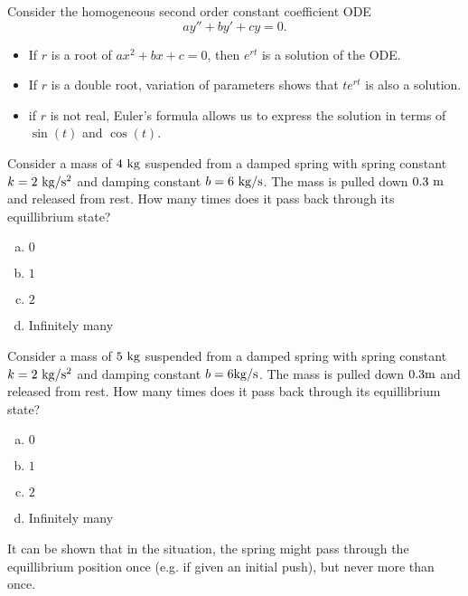 
\begin{applicationActivities}

\begin{observation}
Consider the homogeneous second order constant coefficient ODE \[ay''+by'+cy=0.\]
\vfill
\begin{itemize}
\item If \(r\) is a root of \(ax^2+bx+c=0\), then \(e^{rt}\) is a solution of the ODE.
\item If \(r\) is a double root, variation of parameters shows that \(te^{rt}\) is also a solution.
\item if \(r\) is not real, Euler's formula allows us to express the solution in terms of \(\sin(t)\) and \(\cos(t)\).
\end{itemize}
\end{observation}

\begin{activity}{15}
Consider a mass of \(4\ {\rm kg}\) suspended from a damped spring with spring constant \(k=2\ {\rm kg/s^2}\) and damping constant \(b= 6\ {\rm kg/s}\).  
\vfill
The mass is pulled down \(0.3\ {\rm m}\) and released from rest.  How many times does it pass back through its equillibrium state?
\vfill
\begin{enumerate}[(a)]
\item \(0\)
\item \(1\)
\item \(2\)
\item Infinitely many
\end{enumerate}
\end{activity}

\begin{activity}{15}
Consider a mass of \(5\ {\rm kg}\) suspended from a damped spring with spring constant \(k=2\ {\rm kg/s^2}\) and damping constant \(b= 6{\rm kg/s}\).  
\vfill
The mass is pulled down \(0.3 {\rm m}\) and released from rest.  How many times does it pass back through its equillibrium state?
\vfill
\begin{enumerate}[(a)]
\item \(0\)
\item \(1\)
\item \(2\)
\item Infinitely many
\end{enumerate}
\end{activity}

\begin{observation}
It can be shown that in the  situation, the spring might pass through the equillibrium position once (e.g. if given an initial push), but never more than once.
\end{observation}


\end{applicationActivities}
